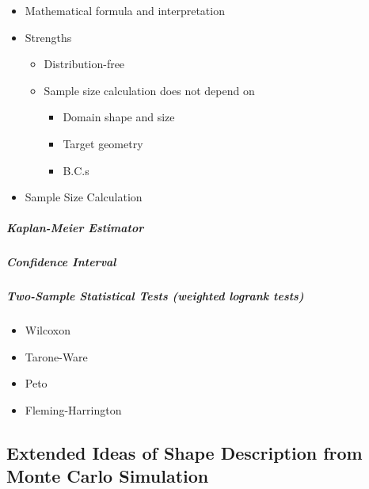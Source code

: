         \begin{itemize}        
          \item Mathematical formula and interpretation
          \item Strengths
            \begin{itemize}
              \item Distribution-free
              \item Sample size calculation does not depend on 
                \begin{itemize}
                  \item Domain shape and size
                  \item Target geometry
                  \item B.C.s
                \end{itemize}
            \end{itemize}
          \item Sample Size Calculation
        \end{itemize}

          

        \subparagraph{Kaplan-Meier Estimator \cite{kaplan1958nonparametric} \cite{aalen2008survival}}
        \subparagraph{Confidence Interval \cite{greenwoodnatural} \cite{hosmer2011applied} \cite{kalbfleisch2011statistical}\cite{sawyer2003greenwood}}
        \subparagraph{Two-Sample Statistical Tests (weighted logrank tests) \cite{custodio2007diagnostics} \cite{agarwal2012statistics} \cite{karadeniz2017examining} \cite{leton2001equivalence} \cite{etikan2017kaplan} \cite{harrington1982class}}
          \begin{itemize}
            \item Wilcoxon
            \item Tarone-Ware
            \item Peto
            \item Fleming-Harrington
          \end{itemize}

          


\subsection{Extended Ideas of Shape Description from Monte Carlo Simulation}

